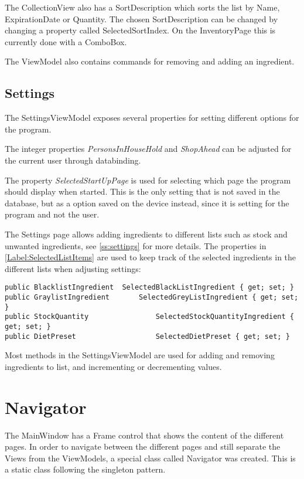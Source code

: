 The CollectionView also has a SortDescription which sorts the list by Name, ExpirationDate or Quantity. The chosen SortDescription can be changed by changing a property called SelectedSortIndex. On the InventoryPage this is currently done with a ComboBox.

The ViewModel also contains commands for removing and adding an ingredient.

\section{Settings}
The SettingsViewModel exposes several properties for setting different options for the program.

The integer properties \textit{PersonsInHouseHold} and \textit{ShopAhead} can be adjusted for the current user through databinding.

The property \textit{SelectedStartUpPage} is used for selecting which page the program should display when started. This is the only setting that is not saved in the database, but as a option saved on the device instead, since it is setting for the program and not the user.

The Settings page allows adding ingredients to different lists such as stock and unwanted ingredients, see \cref{ss:settings} for more details.
The properties in \cref{Label:SelectedListItems} are used to keep track of the selected ingredients in the different lists when adjusting settings:
\begin{lstlisting}[caption=Selected list items, language=CSharp, label={Label:SelectedListItems}]
public BlacklistIngredient	SelectedBlackListIngredient { get; set; }
public GraylistIngredient		SelectedGreyListIngredient { get; set; }
public StockQuantity 				SelectedStockQuantityIngredient { get; set; }
public DietPreset 					SelectedDietPreset { get; set; }
\end{lstlisting}

Most methods in the SettingsViewModel are used for adding and removing ingredients to list, and incrementing or decrementing values.

\chapter{Navigator}
The MainWindow has a Frame control that shows the content of the different pages. In order to navigate between the different pages and still separate the Views from the ViewModels, a special class called Navigator was created. This is a static class following the singleton pattern. 

